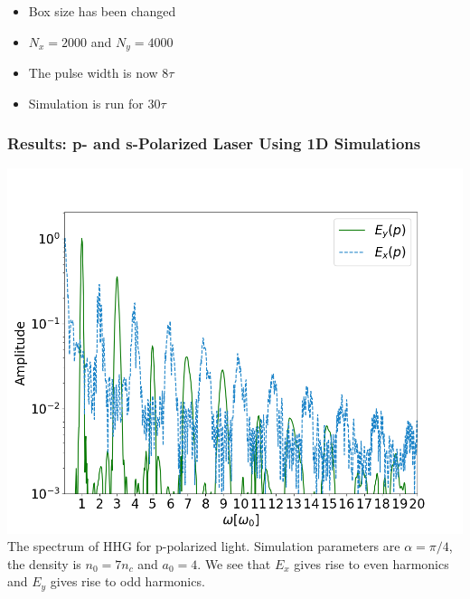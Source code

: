 \documentclass{beamer}
\begin{document}
\begin{frame}
    \begin{minipage}[t]{0.34\linewidth}
        \begin{center}
            \begin{itemize}
                \item Box size has been changed
                \item $N_x = 2000$ and $N_y = 4000$
                \item The pulse width is now $8\tau$
                \item Simulation is run for $30\tau$
            \end{itemize}
        \end{center}
    \end{minipage}
\end{frame}

\begin{frame}
    \frametitle{Results: p- and s-Polarized Laser Using 1D Simulations}
    \begin{minipage}[h]{0.48\linewidth}
        \centering
        \includegraphics[width=1\textwidth, height=0.60\textheight]{images/p_fft.png}
        \scriptsize{The spectrum of HHG for p-polarized light. Simulation parameters are $\alpha = \pi/4$, the density is $n_0 = 7n_c$ and $a_0 = 4$. We see that $E_x$ gives rise to even harmonics and $E_y$ gives rise to odd harmonics.}
        \label{fig:p-peak}
    \end{minipage}
    \begin{minipage}[h]{0.48\linewidth}
        \centering

\end{minipage}
\end{frame}
\end{document}
